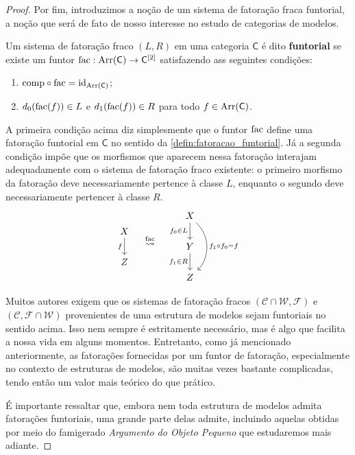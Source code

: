 \begin{proof}
  Por fim, introduzimos a noção de um sistema de fatoração fraca funtorial, a noção que será de fato de nosso interesse no estudo de categorias de modelos.
  
  \begin{defin}\label{defin:fatoracao_fraca_funtorial}
    Um sistema de fatoração fraco $(L,R)$ em uma categoria $\mathsf{C}$ é dito \textbf{funtorial} se existe um funtor $\mathrm{fac}: \mathrm{Arr}(\mathsf{C}) \to \mathsf{C}^{[2]}$ satisfazendo ass seguintes condições:
    \begin{enumerate}
    \item $\mathrm{comp} \circ \mathrm{fac} = \mathrm{id}_{\mathrm{Arr}(\mathsf{C})}$;
      
    \item $d_{0}(\mathrm{fac}(f)) \in L$ e $d_{1}(\mathrm{fac}(f)) \in R$ para todo $f \in \mathrm{Arr}(\mathsf{C})$.
    \end{enumerate}
  \end{defin}
  
  A primeira condição acima diz simplesmente que o funtor $\mathrm{fac}$ define uma fatoração funtorial em $\mathsf{C}$ no sentido da \cref{defin:fatoracao_funtorial}.
  Já a segunda condição impõe que os morfismos que aparecem nessa fatoração interajam adequadamente com o sistema de fatoração fraco existente: o primeiro morfismo da fatoração deve necessariamente pertence à classe $L$, enquanto o segundo deve necessariamente pertencer à classe $R$.
  \begin{equation}\label{eq:fatoracao_fraca_funtorial_diag}
    \begin{tikzcd}
      X
      \arrow[d, "f" swap]
      \\ Z
    \end{tikzcd}
    \quad \overset{\fac}{\rightsquigarrow} \quad
    \begin{tikzcd}
      X
      \arrow[d, "f_{0} \in L" swap]
      \arrow[dd, bend left=45, "f_{1} \circ f_{0} = f"]
      \\ Y
      \arrow[d, "f_{1} \in R" swap]
      \\ Z
    \end{tikzcd}
  \end{equation}
  
  Muitos autores exigem que os sistemas de fatoração fracos $(\mathcal{C} \cap \mathcal{W},\mathcal{F})$ e $(\mathcal{C},\mathcal{F} \cap \mathcal{W})$ provenientes de uma estrutura de modelos sejam funtoriais no sentido acima.
  Isso nem sempre é estritamente necessário, mas é algo que facilita a nossa vida em alguns momentos.
  Entretanto, como já mencionado anteriormente, as fatorações fornecidas por um funtor de fatoração, especialmente no contexto de estruturas de modelos, são muitas vezes bastante complicadas, tendo então um valor mais teórico do que prático.
  
  É importante ressaltar que, embora nem toda estrutura de modelos admita fatorações funtoriais, uma grande parte delas admite, incluindo aquelas obtidas por meio do famigerado \emph{Argumento do Objeto Pequeno} que estudaremos mais adiante.
\end{proof}